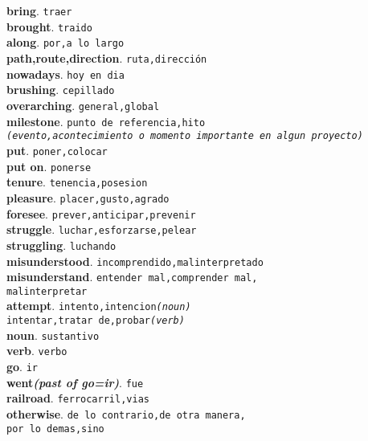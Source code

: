 \documentclass[twocolumn]{article}
\begin{document}
	\textsf{\textbf{bring}}. \texttt{traer}\\
	\textsf{\textbf{brought}}. \texttt{traido}\\
	\textsf{\textbf{along}}. \texttt{por,a lo largo}\\
	\textsf{\textbf{path,route,direction}}. \texttt{ruta,direcci\'on}\\
	\textsf{\textbf{nowadays}}. \texttt{hoy en dia}\\
	\textsf{\textbf{brushing}}. \texttt{cepillado}\\
	\textsf{\textbf{overarching}}. \texttt{general,global}\\
	\textsf{\textbf{milestone}}. \texttt{punto de referencia,hito\\{\scriptsize \textsl{(evento,acontecimiento o momento importante en algun proyecto)}}}\\
	\textsf{\textbf{put}}. \texttt{poner,colocar}\\
	\textsf{\textbf{put on}}. \texttt{ponerse}\\
	\textsf{\textbf{tenure}}. \texttt{tenencia,posesion}\\
	\textsf{\textbf{pleasure}}. \texttt{placer,gusto,agrado}\\
	\textsf{\textbf{foresee}}. \texttt{prever,anticipar,prevenir}\\
	\textsf{\textbf{struggle}}. \texttt{luchar,esforzarse,pelear}\\
	\textsf{\textbf{struggling}}. \texttt{luchando}\\
	\textsf{\textbf{misunderstood}}. \texttt{incomprendido,malinterpretado}\\
	\textsf{\textbf{misunderstand}}. \texttt{entender mal,comprender mal,\\malinterpretar}\\
	\textsf{\textbf{attempt}}. \texttt{intento,intencion{\scriptsize \textsl{(noun)}}\\intentar,tratar de,probar{\scriptsize \textsl{(verb)}}}\\
	\textsf{\textbf{noun}}. \texttt{sustantivo}\\
	\textsf{\textbf{verb}}. \texttt{verbo}\\
	\textsf{\textbf{go}}. \texttt{ir}\\
	\textsf{\textbf{went{\scriptsize \textsl{(past of go=ir)}}}}. \texttt{fue}\\
	\textsf{\textbf{railroad}}. \texttt{ferrocarril,vias}\\
	\textsf{\textbf{otherwise}}. \texttt{de lo contrario,de otra manera,\\por lo demas,sino}\\
\end{document}
